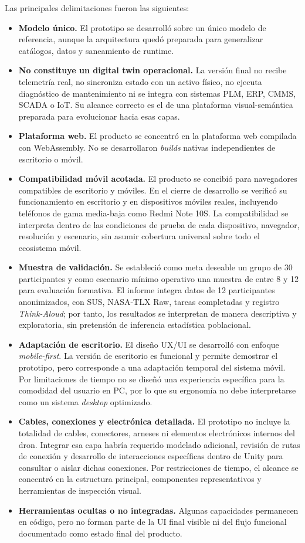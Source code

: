 Las principales delimitaciones fueron las siguientes:

\begin{itemize}
    \item \textbf{Modelo único.} El prototipo se desarrolló sobre un único modelo de referencia, aunque la arquitectura quedó preparada para generalizar catálogos, datos y saneamiento de runtime.
    \item \textbf{No constituye un digital twin operacional.} La versión final no recibe telemetría real, no sincroniza estado con un activo físico, no ejecuta diagnóstico de mantenimiento ni se integra con sistemas PLM, ERP, CMMS, SCADA o IoT. Su alcance correcto es el de una plataforma visual-semántica preparada para evolucionar hacia esas capas.
    \item \textbf{Plataforma web.} El producto se concentró en la plataforma web compilada con WebAssembly. No se desarrollaron \textit{builds} nativas independientes de escritorio o móvil.
    \item \textbf{Compatibilidad móvil acotada.} El producto se concibió para navegadores compatibles de escritorio y móviles. En el cierre de desarrollo se verificó su funcionamiento en escritorio y en dispositivos móviles reales, incluyendo teléfonos de gama media-baja como Redmi Note 10S. La compatibilidad se interpreta dentro de las condiciones de prueba de cada dispositivo, navegador, resolución y escenario, sin asumir cobertura universal sobre todo el ecosistema móvil.
    \item \textbf{Muestra de validación.} Se estableció como meta deseable un grupo de 30 participantes y como escenario mínimo operativo una muestra de entre 8 y 12 para evaluación formativa. El informe integra datos de 12 participantes anonimizados, con SUS, NASA-TLX Raw, tareas completadas y registro \textit{Think-Aloud}; por tanto, los resultados se interpretan de manera descriptiva y exploratoria, sin pretensión de inferencia estadística poblacional.
    \item \textbf{Adaptación de escritorio.} El diseño UX/UI se desarrolló con enfoque \textit{mobile-first}. La versión de escritorio es funcional y permite demostrar el prototipo, pero corresponde a una adaptación temporal del sistema móvil. Por limitaciones de tiempo no se diseñó una experiencia específica para la comodidad del usuario en PC, por lo que su ergonomía no debe interpretarse como un sistema \textit{desktop} optimizado.
    \item \textbf{Cables, conexiones y electrónica detallada.} El prototipo no incluye la totalidad de cables, conectores, arneses ni elementos electrónicos internos del dron. Integrar esa capa habría requerido modelado adicional, revisión de rutas de conexión y desarrollo de interacciones específicas dentro de Unity para consultar o aislar dichas conexiones. Por restricciones de tiempo, el alcance se concentró en la estructura principal, componentes representativos y herramientas de inspección visual.
    \item \textbf{Herramientas ocultas o no integradas.} Algunas capacidades permanecen en código, pero no forman parte de la UI final visible ni del flujo funcional documentado como estado final del producto.
\end{itemize}

\newpage
